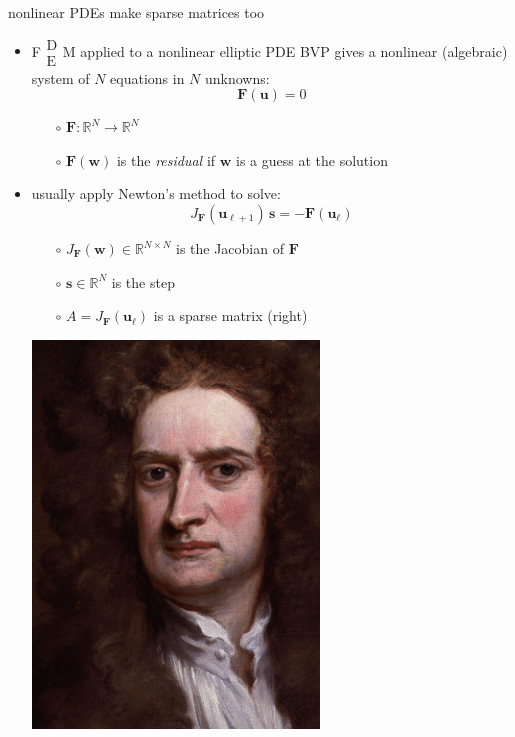 \documentclass[hide notes,intlimits,usenames,dvipsnames]{beamer}
\newcommand{\RR}{\mathbb{R}}
\newcommand{\bs}{\mathbf{s}}
\newcommand{\bu}{\mathbf{u}}
\newcommand{\bw}{\mathbf{w}}
\newcommand{\FM}{F$\begin{smallmatrix} \text{D} \\ \text{E} \end{smallmatrix}$M\xspace}
\begin{document}
\begin{frame}{nonlinear PDEs make sparse matrices too}
\begin{itemize}
\item \FM applied to a nonlinear elliptic PDE BVP gives a nonlinear (algebraic) system of $N$ equations in $N$ unknowns:
    $$\mathbf{F}(\bu)=0$$
     \vspace{-4mm}
	\begin{itemize}
	\item[$\circ$] $\mathbf{F}:\RR^N\to\RR^N$
	\item[$\circ$] $\mathbf{F}(\bw)$ is the \emph{residual} if $\bw$ is a guess at the solution
	\end{itemize}

\item \begin{minipage}[t]{70mm}
usually apply Newton's method to solve:
    $$J_{\mathbf{F}}(\bu_{\ell+1})\, \bs = - \mathbf{F}(\bu_\ell)$$
     \vspace{-4mm}
	\begin{itemize}
	\item[$\circ$] $J_{\mathbf{F}}(\bw) \in \RR^{N\times N}$ is the Jacobian of $\mathbf{F}$
	\item[$\circ$] $\bs \in \RR^N$ is the step
	\item[$\circ$] $A=J_{\mathbf{F}}(\bu_\ell)$ is a sparse matrix (right)
	\end{itemize}
\end{minipage}
\quad
\begin{minipage}[t]{20mm}
\vspace{0mm}
\hfill \includegraphics[width=0.6\textwidth]{figs/newton}


\end{minipage}
\end{itemize}
\end{frame}
\end{document}
